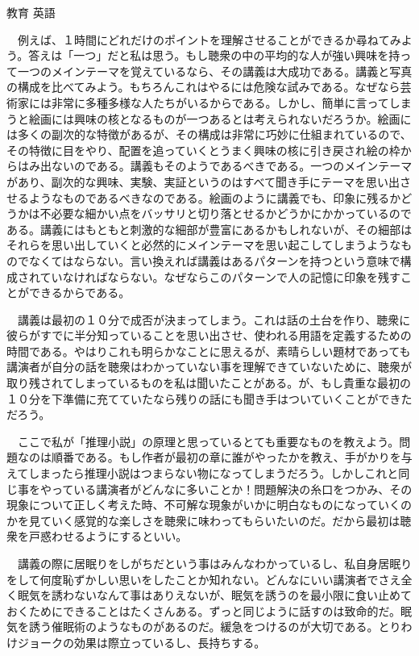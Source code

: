 \documentclass[fleqn]{jbook}
\begin{document}
\begin{answer}{教育 英語}{}
\begin{subanswers}
　例えば、１時間にどれだけのポイントを理解させることができるか尋ねてみよう。答えは「一つ」だと私は思う。もし聴衆の中の平均的な人が強い興味を持って一つのメインテーマを覚えているなら、その講義は大成功である。講義と写真の構成を比べてみよう。もちろんこれはやるには危険な試みである。なぜなら芸術家には非常に多種多様な人たちがいるからである。しかし、簡単に言ってしまうと絵画には興味の核となるものが一つあるとは考えられないだろうか。絵画には多くの副次的な特徴があるが、その構成は非常に巧妙に仕組まれているので、その特徴に目をやり、配置を追っていくとうまく興味の核に引き戻され絵の枠からはみ出ないのである。講義もそのようであるべきである。一つのメインテーマがあり、副次的な興味、実験、実証というのはすべて聞き手にテーマを思い出させるようなものであるべきなのである。絵画のように講義でも、印象に残るかどうかは不必要な細かい点をバッサリと切り落とせるかどうかにかかっているのである。講義にはもともと刺激的な細部が豊富にあるかもしれないが、その細部はそれらを思い出していくと必然的にメインテーマを思い起こしてしまうようなものでなくてはならない。言い換えれば講義はあるパターンを持つという意味で構成されていなければならない。なぜならこのパターンで人の記憶に印象を残すことができるからである。

　講義は最初の１０分で成否が決まってしまう。これは話の土台を作り、聴衆に彼らがすでに半分知っていることを思い出させ、使われる用語を定義するための時間である。やはりこれも明らかなことに思えるが、素晴らしい題材であっても講演者が自分の話を聴衆はわかっていない事を理解できていないために、聴衆が取り残されてしまっているものを私は聞いたことがある。が、もし貴重な最初の１０分を下準備に充てていたなら残りの話にも聞き手はついていくことができただろう。

　ここで私が「推理小説」の原理と思っているとても重要なものを教えよう。問題なのは順番である。もし作者が最初の章に誰がやったかを教え、手がかりを与えてしまったら推理小説はつまらない物になってしまうだろう。しかしこれと同じ事をやっている講演者がどんなに多いことか！問題解決の糸口をつかみ、その現象について正しく考えた時、不可解な現象がいかに明白なものになっていくのかを見ていく感覚的な楽しさを聴衆に味わってもらいたいのだ。だから最初は聴衆を戸惑わせるようにするといい。

　講義の際に居眠りをしがちだという事はみんなわかっているし、私自身居眠りをして何度恥ずかしい思いをしたことか知れない。どんなにいい講演者でさえ全く眠気を誘わないなんて事はありえないが、眠気を誘うのを最小限に食い止めておくためにできることはたくさんある。ずっと同じように話すのは致命的だ。眠気を誘う催眠術のようなものがあるのだ。緩急をつけるのが大切である。とりわけジョークの効果は際立っているし、長持ちする。


\end{subanswers}
\end{answer}
\end{document}
